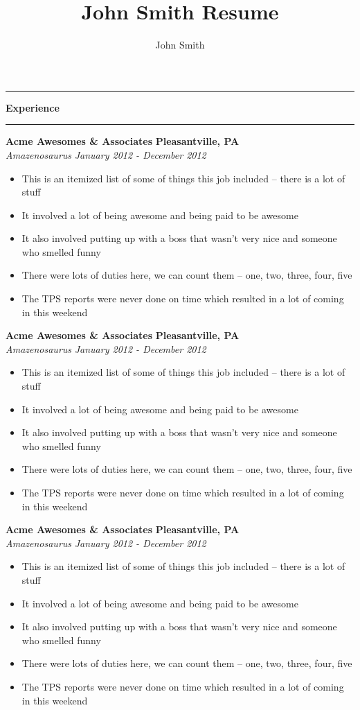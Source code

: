 \documentclass[10pt,letterpaper]{article}			%
\author{John Smith}							%
\title{John Smith Resume}						%
\newcommand{
    \JobHeader}[4]{
    \textbf{Acme Awesomes \& Associates}
	\hfill
	\textbf{Pleasantville, PA}
	\\
    \emph{Amazenosaurus}
	\hfill
	\emph{January 2012 - December 2012}
	}
\newcommand{
    \sectionHeader}[1]{
    \hrule
    \vspace{0.2em}
    {\large \textbf {#1}}
    \vspace{0.2em}
    \hrule
    \vspace{0.2em}
    }
\begin{document}

\sectionHeader{Experience}

	\JobHeader{Employer}{Location}{Title}{From -- To}
		\begin{itemize}
            \item This is an itemized list of some of things this job included -- there is a lot of stuff
		    \item It involved a lot of being awesome and being paid to be awesome
            \item It also involved putting up with a boss that wasn't very nice and someone who smelled funny
            \item There were lots of duties here, we can count them -- one, two, three, four, five
		    \item The TPS reports were never done on time which resulted in a lot of coming in this weekend
		\end{itemize}

	\JobHeader{Employer}{Location}{Title}{From -- To}
		\begin{itemize}
            \item This is an itemized list of some of things this job included -- there is a lot of stuff
		    \item It involved a lot of being awesome and being paid to be awesome
            \item It also involved putting up with a boss that wasn't very nice and someone who smelled funny
            \item There were lots of duties here, we can count them -- one, two, three, four, five
		    \item The TPS reports were never done on time which resulted in a lot of coming in this weekend
		\end{itemize}	
    
    \JobHeader{Employer}{Location}{Title}{From -- To}
		\begin{itemize}
            \item This is an itemized list of some of things this job included -- there is a lot of stuff
		    \item It involved a lot of being awesome and being paid to be awesome
            \item It also involved putting up with a boss that wasn't very nice and someone who smelled funny
            \item There were lots of duties here, we can count them -- one, two, three, four, five
		    \item The TPS reports were never done on time which resulted in a lot of coming in this weekend
		\end{itemize}
\end{document}
